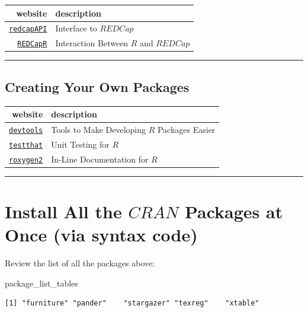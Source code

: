 \documentclass[]{book}
\newenvironment{Shaded}{\begin{snugshade}}{\end{snugshade}}
\newcommand{\NormalTok}[1]{#1}
\theoremstyle{definition}
\theoremstyle{definition}
\theoremstyle{definition}
\theoremstyle{remark}
\begin{document}
\begin{longtable}[]{@{}rl@{}}
\toprule
website & description\tabularnewline
\midrule
\endhead
\href{https://github.com/nutterb/redcapAPI/wiki}{\texttt{redcapAPI}} &
Interface to \(REDCap\)\tabularnewline
\href{https://github.com/OuhscBbmc/REDCapR}{\texttt{REDCapR}} &
Interaction Between \(R\) and \(REDCap\)\tabularnewline
\bottomrule
\end{longtable}

\begin{center}\rule{0.5\linewidth}{\linethickness}\end{center}

\subsection{Creating Your Own
Packages}\label{creating-your-own-packages}

\begin{longtable}[]{@{}rl@{}}
\toprule
website & description\tabularnewline
\midrule
\endhead
\href{https://github.com/r-lib/devtools}{\texttt{devtools}} & Tools to
Make Developing \(R\) Packages Easier\tabularnewline
\href{https://github.com/r-lib/testthat}{\texttt{testthat}} & Unit
Testing for \(R\)\tabularnewline
\href{https://cran.r-project.org/web/packages/roxygen2/vignettes/roxygen2.html}{\texttt{roxygen2}}
& In-Line Documentation for \(R\)\tabularnewline
\bottomrule
\end{longtable}

\begin{center}\rule{0.5\linewidth}{\linethickness}\end{center}

\section{\texorpdfstring{Install All the \(CRAN\) Packages at Once (via
syntax
code)}{Install All the CRAN Packages at Once (via syntax code)}}\label{install-all-the-cran-packages-at-once-via-syntax-code}

Review the list of all the packages above:

\begin{Shaded}
\begin{Highlighting}[]
\NormalTok{package_list_tables}
\end{Highlighting}
\end{Shaded}

\begin{verbatim}
[1] "furniture" "pander"    "stargazer" "texreg"    "xtable"   
\end{verbatim}
\end{document}

